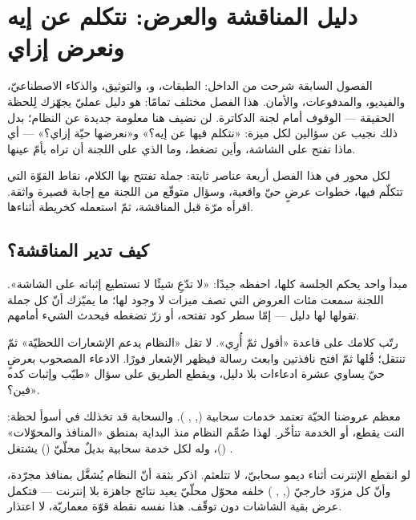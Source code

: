 \section{دليل المناقشة والعرض: نتكلم عن إيه ونعرض إزاي}

الفصول السابقة شرحت  من الداخل: الطبقات، و، والتوثيق،
والذكاء الاصطناعيّ، والفيديو، والمدفوعات، والأمان. هذا الفصل مختلف تمامًا: هو دليل
عمليّ يجهّزك لِلحظة الحقيقة — الوقوف أمام لجنة الدكاترة. لن نضيف هنا معلومة جديدة
عن النظام؛ بدل ذلك نجيب عن سؤالين لكل ميزة: «نتكلم فيها عن إيه؟» و«نعرضها حيّة
إزاي؟» — أي ماذا تفتح على الشاشة، وأين تضغط، وما الذي على اللجنة أن تراه بأمّ عينها.

لكل محور في هذا الفصل أربعة عناصر ثابتة: جملة تفتتح بها الكلام، نقاط القوّة التي
تتكلّم فيها، خطوات عرضٍ حيّ واقعية، وسؤال متوقّع من اللجنة مع إجابة قصيرة واثقة.
اقرأه مرّة قبل المناقشة، ثمّ استعمله كخريطة أثناءها.

\subsection{كيف تدير المناقشة؟}

مبدأ واحد يحكم الجلسة كلها، احفظه جيدًا: «لا تدّعِ شيئًا لا تستطيع إثباته على
الشاشة». اللجنة سمعت مئات العروض التي تصف ميزات لا وجود لها؛ ما يميّزك أنّ كل جملة
تقولها لها دليل — إمّا سطر كود تفتحه، أو زرّ تضغطه فيحدث الشيء أمامهم.

\begin{keyp}
رتّب كلامك على قاعدة «أقول ثمّ أُرِي». لا تقل «النظام يدعم الإشعارات اللحظيّة» ثمّ
تنتقل؛ قُلها ثمّ افتح نافذتين وابعث رسالة فيظهر الإشعار فورًا. الادعاء المصحوب
بعرضٍ حيّ يساوي عشرة ادعاءات بلا دليل، ويقطع الطريق على سؤال «طيّب وإثبات كده فين؟».
\end{keyp}

معظم عروضنا الحيّة تعتمد خدمات سحابية (, , ).
والسحابة قد تخذلك في أسوأ لحظة: النت يقطع، أو الخدمة تتأخّر. لهذا صُمِّم النظام منذ
البداية بمنطق «المنافذ والمحوّلات» ()، وله لكل خدمة سحابية بديلٌ
محلّيّ () يشتغل .

\begin{note}
لو انقطع الإنترنت أثناء ديمو سحابيّ، لا تتلعثم. اذكر بثقة أنّ النظام يُشغَّل بمنافذ
مجرّدة، وأنّ كل مزوّد خارجيّ (, , ) خلفه محوّل
 محلّيّ يعيد نتائج جاهزة بلا إنترنت — فتكمل عرض بقية الشاشات دون توقّف. هذا
نفسه نقطة قوّة معماريّة، لا اعتذار.
\end{note}


